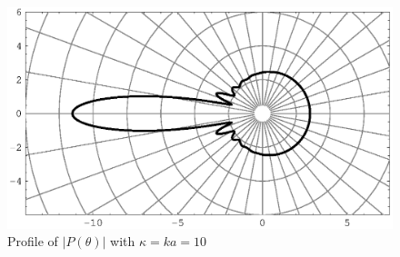 \documentclass[12pt]{article}
\begin{document}
\begin{figure}[p]
\begin{center}
\includegraphics[scale=1]{./ffc-k10-512-05.eps}
\caption{Profile of $|P(\theta)|$ with $\kappa=ka=10$}
\label{far-field-coeff}
\end{center}
\end{figure}
\end{document}
